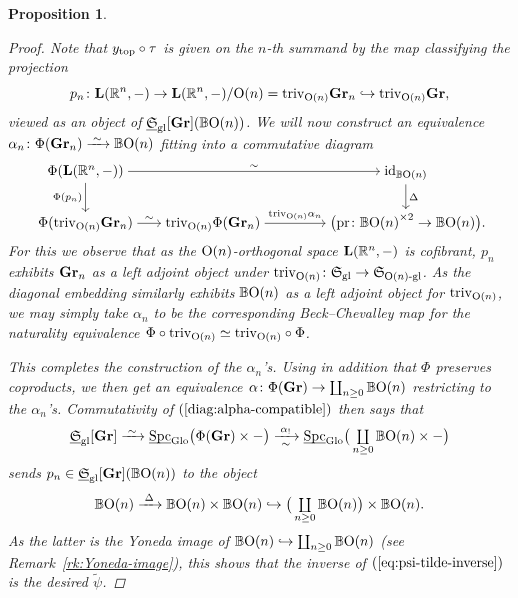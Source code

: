 \documentclass[reqno]{memo-l}
\theoremstyle{mythm}
\newtheorem{prop}[thm]{Proposition}
\theoremstyle{definition}
\numberwithin{equation}{section}
\newcommand{\R} {{\mathbb{R}}}
\newcommand{\gl}{\textup{gl}}
\DeclareMathOperator{\Spc}{Spc}
\renewcommand{\top}{{\textup{top}}}
\newcommand{\cat}[1]{\textbf{\textup{#1}}}
\newcommand{\triv}{{\textup{triv}}}
\renewcommand{\O}{{\textup{O}}}
\newcommand{\id}{\textup{id}}
\newcommand{\pr}{\textup{pr}}
\newcommand{\Glo}{\textup{Glo}}
\newcommand{\BGcat}[1]{\mathbb B{#1}}
\newcommand{\ulhelper}[2]{\underline{\setbox0=\hbox{$#1#2$}\dp0=0.4pt \box0\relax}}
\newcommand{\ul}[1]{{\mathpalette\ulhelper{#1}}\hbox{\rule[-2pt]{0pt}{0pt}}}
\newcommand{\iso}{\xrightarrow{\;\smash{\raisebox{-0.25ex}{\ensuremath{\scriptstyle\sim}}}\;}}
\newcommand{\myS}{{{\mathfrak S\kern-.4pt}}}
\newcommand{\Gr}{\cat{Gr}}
\begin{document}
\begin{prop}
\begin{proof}
        Note that $y_\top\circ\tau$ is given on the $n$-th summand by the map classifying the projection \[p_n\colon\cat{L}(\R^n,-)\to\cat{L}(\R^n,-)/\O(n)=\triv_{\O(n)}\cat{Gr}_n\hookrightarrow\triv_{\O(n)}\cat{Gr},\] viewed as an object of $\ul\myS_\gl[\cat{Gr}](\BGcat{\O(n)})$. We will now construct an equivalence $\alpha_n\colon\Phi(\cat{Gr}_n)\iso{\BGcat{\O(n)}}$ fitting into a commutative diagram
        \begin{equation}\label{diag:alpha-compatible}
            \begin{tikzcd}[cramped]
                \Phi(\cat{L}(\R^n,-))\arrow[d,"\Phi(p_n)"']\arrow[rr,"\sim"] &[-.67em]&[2em] \id_{\BGcat{\O(n)}}\arrow[d,"\Delta"]\\
                \Phi(\triv_{\O(n)}\cat{Gr}_n)\arrow[r,"\sim"] & \triv_{\O(n)}\Phi(\cat{Gr}_n)\arrow[r,"\triv_{\O(n)}\alpha_n"] & \big(\pr\colon\BGcat{\O(n)}^{\times2}\to\BGcat{\O(n)}\big)\rlap.
            \end{tikzcd}
        \end{equation}
        For this we observe that as the $\O(n)$-orthogonal space $\cat{L}(\R^n,-)$ is cofibrant, $p_n$ exhibits $\cat{Gr}_n$ as a left adjoint object under $\triv_{\O(n)}\colon\myS_\gl\to\myS_\text{$\O(n)$-gl}$. As the diagonal embedding similarly exhibits $\BGcat{\O(n)}$ as a left adjoint object for $\triv_{\O(n)}$, we may simply take $\alpha_n$ to be the corresponding Beck--Chevalley map for the naturality equivalence $\Phi\circ\triv_{\O(n)}\simeq\triv_{\O(n)}\circ\Phi$. 
        
        This completes the construction of the $\alpha_n$'s.  
        Using in addition that $\Phi$ preserves coproducts, we then get an equivalence $\alpha\colon\Phi(\cat{Gr})\to\coprod_{n\ge0}\BGcat{\O(n)}$ restricting to the $\alpha_n$'s. Commutativity of $(\ref{diag:alpha-compatible})$ then says that
        \begin{equation}\label{eq:psi-tilde-inverse}
            \ul\myS_\gl[\cat{Gr}]\iso\ul\Spc_{\Glo}\big(\Phi(\cat{\Gr})\times{-}\big)\xrightarrow[\raise3pt\hbox{$\scriptstyle\sim$}]{\;\alpha_!\;}\ul\Spc_{\Glo}\big(\textstyle\coprod\limits_{\smash{n\ge0}}\BGcat{\O(n)}\times{-}\big)
        \end{equation}
        sends $p_n\in\ul\myS_\gl[\cat{Gr}](\BGcat{\O(n)})$ to the object
        \[
            \BGcat{\O(n)}\xrightarrow{\;\Delta\;}
            \BGcat{\O(n)}\times\BGcat{\O(n)}\hookrightarrow
            \big(\textstyle\coprod\limits_{\smash{n\ge0}}\BGcat{\O(n)}\big)\times\BGcat{\O(n)}.
        \]
        As the latter is the Yoneda image of $\BGcat{\O(n)}\hookrightarrow\coprod_{n\ge0}\BGcat{\O(n)}$ (see Remark~\ref{rk:Yoneda-image}), this shows that the inverse of $(\ref{eq:psi-tilde-inverse})$ is the desired $\tilde{\psi}$.
    \end{proof}
\end{prop}
\end{document}
